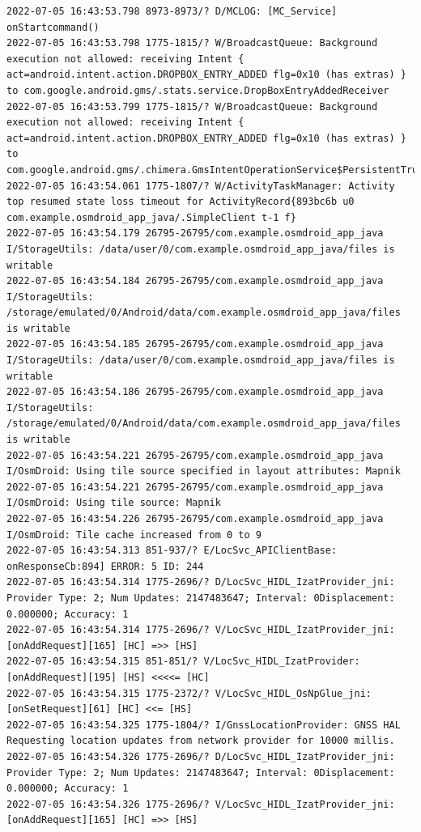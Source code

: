 \documentclass[a4paper,12pt]{book}
\begin{document}
\begin{lstlisting}
2022-07-05 16:43:53.798 8973-8973/? D/MCLOG: [MC_Service] onStartcommand()
2022-07-05 16:43:53.798 1775-1815/? W/BroadcastQueue: Background execution not allowed: receiving Intent { act=android.intent.action.DROPBOX_ENTRY_ADDED flg=0x10 (has extras) } to com.google.android.gms/.stats.service.DropBoxEntryAddedReceiver
2022-07-05 16:43:53.799 1775-1815/? W/BroadcastQueue: Background execution not allowed: receiving Intent { act=android.intent.action.DROPBOX_ENTRY_ADDED flg=0x10 (has extras) } to com.google.android.gms/.chimera.GmsIntentOperationService$PersistentTrustedReceiver
2022-07-05 16:43:54.061 1775-1807/? W/ActivityTaskManager: Activity top resumed state loss timeout for ActivityRecord{893bc6b u0 com.example.osmdroid_app_java/.SimpleClient t-1 f}
2022-07-05 16:43:54.179 26795-26795/com.example.osmdroid_app_java I/StorageUtils: /data/user/0/com.example.osmdroid_app_java/files is writable
2022-07-05 16:43:54.184 26795-26795/com.example.osmdroid_app_java I/StorageUtils: /storage/emulated/0/Android/data/com.example.osmdroid_app_java/files is writable
2022-07-05 16:43:54.185 26795-26795/com.example.osmdroid_app_java I/StorageUtils: /data/user/0/com.example.osmdroid_app_java/files is writable
2022-07-05 16:43:54.186 26795-26795/com.example.osmdroid_app_java I/StorageUtils: /storage/emulated/0/Android/data/com.example.osmdroid_app_java/files is writable
2022-07-05 16:43:54.221 26795-26795/com.example.osmdroid_app_java I/OsmDroid: Using tile source specified in layout attributes: Mapnik
2022-07-05 16:43:54.221 26795-26795/com.example.osmdroid_app_java I/OsmDroid: Using tile source: Mapnik
2022-07-05 16:43:54.226 26795-26795/com.example.osmdroid_app_java I/OsmDroid: Tile cache increased from 0 to 9
2022-07-05 16:43:54.313 851-937/? E/LocSvc_APIClientBase: onResponseCb:894] ERROR: 5 ID: 244
2022-07-05 16:43:54.314 1775-2696/? D/LocSvc_HIDL_IzatProvider_jni: Provider Type: 2; Num Updates: 2147483647; Interval: 0Displacement: 0.000000; Accuracy: 1
2022-07-05 16:43:54.314 1775-2696/? V/LocSvc_HIDL_IzatProvider_jni: [onAddRequest][165] [HC] =>> [HS]
2022-07-05 16:43:54.315 851-851/? V/LocSvc_HIDL_IzatProvider: [onAddRequest][195] [HS] <<<<= [HC]
2022-07-05 16:43:54.315 1775-2372/? V/LocSvc_HIDL_OsNpGlue_jni: [onSetRequest][61] [HC] <<= [HS]
2022-07-05 16:43:54.325 1775-1804/? I/GnssLocationProvider: GNSS HAL Requesting location updates from network provider for 10000 millis.
2022-07-05 16:43:54.326 1775-2696/? D/LocSvc_HIDL_IzatProvider_jni: Provider Type: 2; Num Updates: 2147483647; Interval: 0Displacement: 0.000000; Accuracy: 1
2022-07-05 16:43:54.326 1775-2696/? V/LocSvc_HIDL_IzatProvider_jni: [onAddRequest][165] [HC] =>> [HS]

\end{lstlisting}
\end{document}
